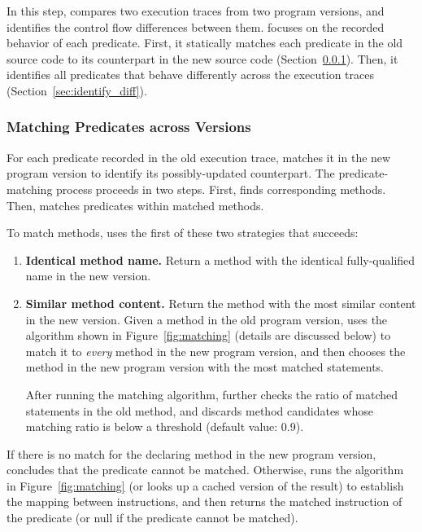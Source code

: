 

In this step, \ourtool compares two execution traces
from two program versions, and identifies the
control flow differences between them. \ourtool focuses on the
recorded behavior of each predicate.
First, it statically
matches each predicate in the old
source code to its counterpart in the new source code
(Section~\ref{sec:match_predicate}).
Then, it identifies all predicates that
behave differently across the execution traces (Section~\ref{sec:identify_diff}).


\subsubsection{Matching Predicates across Versions}
\label{sec:match_predicate}

For each predicate recorded in the old execution trace,
\ourtool matches it in the new program version to identify
its possibly-updated counterpart.
The predicate-matching process proceeds in two steps.
First, \ourtool finds corresponding methods.
Then, \ourtool matches predicates within matched methods.

To match methods, \ourtool uses
the first of these two strategies that succeeds:


\vspace{-1mm}

\begin{enumerate}
\item \textbf{Identical method name.} Return a method with the identical
fully-qualified name in the new version.
\item \textbf{Similar method content.} Return the method with
the most similar content in the new version. Given
a method in the old program version, \ourtool
uses the algorithm shown in Figure~\ref{fig:matching}
(details are discussed below) to match it
to \textit{every} method in the new program version, and then
chooses the method in the new program version with the most matched statements.

After running the matching algorithm, \ourtool further checks the ratio of
matched statements in the old method, and discards method candidates whose
matching ratio is below a threshold (default value: 0.9).
\end{enumerate}


If there is no match for the declaring method in the new program
version, \ourtool concludes that the predicate cannot be
matched. Otherwise, \ourtool runs the algorithm
in Figure~\ref{fig:matching} (or looks up a cached version of the result)
to establish the mapping between
instructions, and then returns the matched instruction of the
predicate (or null if the predicate cannot be matched).


